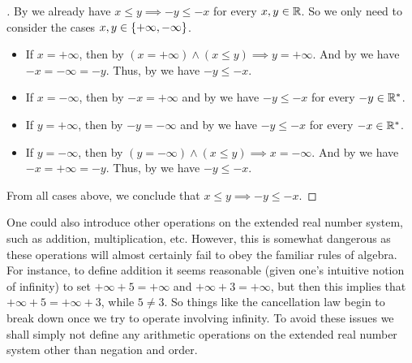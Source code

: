 \begin{proof}[]
  By  we already have \(x \leq y \implies -y \leq -x\) for every \(x, y \in \mathbb{R}\).
  So we only need to consider the cases \(x, y \in \left\lbrace+\infty, -\infty\right\rbrace\).
  \begin{itemize}
    \item If \(x = +\infty\), then by  \((x = +\infty) \land (x \leq y) \implies y = +\infty\).
          And by  we have \(-x = -\infty = -y\).
          Thus, by  we have \(-y \leq -x\).
    \item If \(x = -\infty\), then by  \(-x = +\infty\) and by  we have \(-y \leq -x\) for every \(-y \in \mathbb{R}^*\).
    \item If \(y = +\infty\), then by  \(-y = -\infty\) and by  we have \(-y \leq -x\) for every \(-x \in \mathbb{R}^*\).
    \item If \(y = -\infty\), then by  \((y = -\infty) \land (x \leq y) \implies x = -\infty\).
          And by  we have \(-x = +\infty = -y\).
          Thus, by  we have \(-y \leq -x\).
  \end{itemize}
  From all cases above, we conclude that \(x \leq y \implies -y \leq -x\).
\end{proof}

\begin{note}
  One could also introduce other operations on the extended real number system, such as addition, multiplication, etc.
  However, this is somewhat dangerous as these operations will almost certainly fail to obey the familiar rules of algebra.
  For instance, to define addition it seems reasonable (given one's intuitive notion of infinity) to set \(+\infty + 5 = +\infty\) and \(+\infty + 3 = +\infty\), but then this implies that \(+\infty + 5 = +\infty + 3\), while \(5 \neq 3\).
  So things like the cancellation law begin to break down once we try to operate involving infinity.
  To avoid these issues we shall simply not define any arithmetic operations on the extended real number system other than negation and order.
\end{note}

